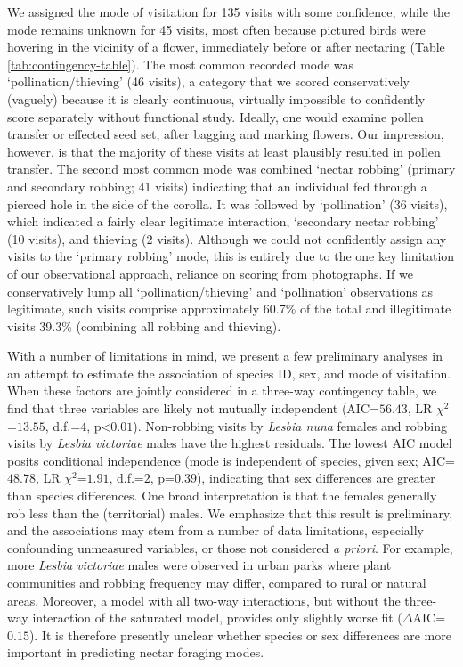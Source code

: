 \documentclass[fleqn,10pt,lineno]{wlpeerj}
\begin{document}
We assigned the mode of visitation for 135 visits with some confidence, while the mode remains unknown for 45 visits, most often because pictured birds were hovering in the vicinity of a flower, immediately before or after nectaring (Table \ref{tab:contingency-table}).
The most common recorded mode was `pollination/thieving' (46 visits), a category that we scored conservatively (vaguely) because it is clearly continuous, virtually impossible to confidently score separately without functional study. 
Ideally, one would examine pollen transfer or effected seed set, after bagging and marking flowers.
Our impression, however, is that the majority of these visits at least plausibly resulted in pollen transfer. 
The second most common mode was combined `nectar robbing' (primary and secondary robbing; 41 visits) indicating that an individual fed through a pierced hole in the side of the corolla.
It was followed by `pollination' (36 visits), which indicated a fairly clear legitimate interaction, `secondary nectar robbing' (10 visits), and thieving (2 visits). 
Although we could not confidently assign any visits to the `primary robbing' mode, this is entirely due to the one key limitation of our observational approach, reliance on scoring from photographs.
If we conservatively lump all `pollination/thieving' and `pollination' observations as legitimate, such visits comprise approximately 60.7\% of the total and illegitimate visits 39.3\% (combining all robbing and thieving).

With a number of limitations in mind, we present a few preliminary analyses in an attempt to estimate the association of species ID, sex, and mode of visitation. 
When these factors are jointly considered in a three-way contingency table, we find that three variables are likely not mutually independent (AIC=$56.43$, LR $\chi^{2}$=$13.55$, d.f.=$4$, p<$0.01$).
Non-robbing visits by \textit{Lesbia nuna} females and robbing visits by \textit{Lesbia victoriae} males have the highest residuals.
The lowest AIC model posits conditional independence (mode is independent of species, given sex; AIC=$48.78$, LR $\chi^{2}$=$1.91$, d.f.=$2$, p=$0.39$), indicating that sex differences are greater than species differences.
One broad interpretation is that the females generally rob less than the (territorial) males.
We emphasize that this result is preliminary, and the associations may stem from a number of data limitations, especially confounding unmeasured variables, or those not considered \textit{a priori}. 
For example, more \textit{Lesbia victoriae} males were observed in urban parks where plant communities and robbing frequency may differ, compared to rural or natural areas.
Moreover, a model with all two-way interactions, but without the three-way interaction of the saturated model, provides only slightly worse fit ($\Delta$AIC=$0.15$). It is therefore presently unclear whether species or sex differences are more important in predicting nectar foraging modes. %
\end{document}
